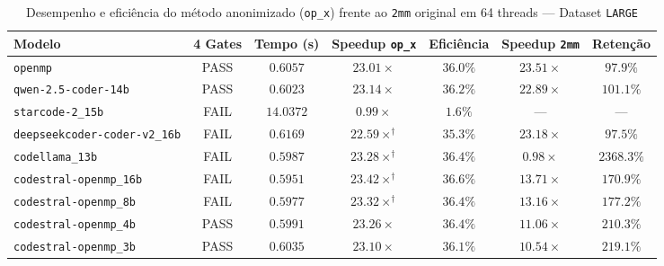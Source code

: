 \begin{table}[htbp]
\centering
\caption{Desempenho e eficiência do método anonimizado (\texttt{op\_x}) frente ao \texttt{2mm} original em 64 threads — Dataset \texttt{LARGE}}
\label{tab:anon_scale_large_64t}
\small
\begin{tabular}{lcccccc}
\toprule
\textbf{Modelo} & \textbf{4 Gates} & \textbf{Tempo (s)} & \textbf{Speedup \texttt{op\_x}} & \textbf{Eficiência} & \textbf{Speedup \texttt{2mm}} & \textbf{Retenção} \\
\midrule
\texttt{openmp} & PASS & $0.6057$ & $23.01\times$ & $36.0\%$ & $23.51\times$ & $97.9\%$ \\
\texttt{qwen-2.5-coder-14b} & PASS & $0.6023$ & $23.14\times$ & $36.2\%$ & $22.89\times$ & $101.1\%$ \\
\texttt{starcode-2\_15b} & FAIL & $14.0372$ & $0.99\times$ & $1.6\%$ & --- & --- \\
\texttt{deepseekcoder-coder-v2\_16b} & FAIL & $0.6169$ & $22.59\times^\dagger$ & $35.3\%$ & $23.18\times$ & $97.5\%$ \\
\texttt{codellama\_13b} & FAIL & $0.5987$ & $23.28\times^\dagger$ & $36.4\%$ & $0.98\times$ & $2368.3\%$ \\
\texttt{codestral-openmp\_16b} & FAIL & $0.5951$ & $23.42\times^\dagger$ & $36.6\%$ & $13.71\times$ & $170.9\%$ \\
\texttt{codestral-openmp\_8b} & FAIL & $0.5977$ & $23.32\times^\dagger$ & $36.4\%$ & $13.16\times$ & $177.2\%$ \\
\texttt{codestral-openmp\_4b} & PASS & $0.5991$ & $23.26\times$ & $36.4\%$ & $11.06\times$ & $210.3\%$ \\
\texttt{codestral-openmp\_3b} & PASS & $0.6035$ & $23.10\times$ & $36.1\%$ & $10.54\times$ & $219.1\%$ \\
\bottomrule
\end{tabular}
\end{table}

